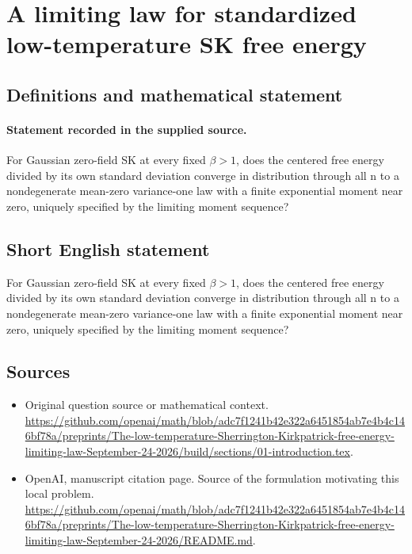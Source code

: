 \documentclass[11pt]{article}
\begin{document}
\section*{A limiting law for standardized low-temperature SK free energy}\label{statement}
\subsection{Definitions and mathematical statement}
\paragraph{Statement recorded in the supplied source.}
For Gaussian zero-field SK at every fixed $\beta >1$, does the centered free energy divided by its own standard deviation converge in distribution through all n to a nondegenerate mean-zero variance-one law with a finite exponential moment near zero, uniquely specified by the limiting moment sequence?
\subsection{Short English statement}
For Gaussian zero-field SK at every fixed $\beta >1$, does the centered free energy divided by its own standard deviation converge in distribution through all n to a nondegenerate mean-zero variance-one law with a finite exponential moment near zero, uniquely specified by the limiting moment sequence?
\subsection{Sources}
\begin{itemize}
\item[S1] Original question source or mathematical context.
\url{https://github.com/openai/math/blob/adc7f1241b42e322a6451854ab7e4b4c146bf78a/preprints/The-low-temperature-Sherrington-Kirkpatrick-free-energy-limiting-law-September-24-2026/build/sections/01-introduction.tex}.
\item[S2] OpenAI, manuscript citation page. Source of the formulation motivating this local problem.
\url{https://github.com/openai/math/blob/adc7f1241b42e322a6451854ab7e4b4c146bf78a/preprints/The-low-temperature-Sherrington-Kirkpatrick-free-energy-limiting-law-September-24-2026/README.md}.
\end{itemize}
\end{document}

